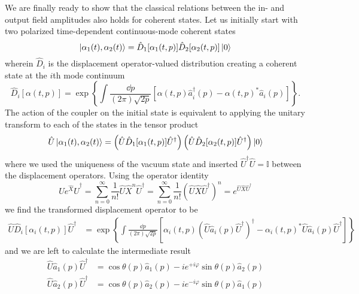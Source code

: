 We are finally ready to show that the classical relations between the in- and output field amplitudes also holds for coherent states.
Let us initially start with two polarized time-dependent continuous-mode coherent states
\begin{equation}
	\ket{\alpha_1(t),\alpha_2(t)}
	=
	\hat{D}_1[\alpha_1(t,p)]
	\hat{D}_2[\alpha_2(t,p)]
	\ket{0}
\end{equation}
wherein $\hat{D}_i$ is the displacement operator-valued distribution creating a coherent state at the $i$th mode continuum
\begin{equation}
	\hat{D}_i[\alpha(t,p)]
	=
	\exp\left\{
		\int\frac{\dd{p}}{(2\pi)\sqrt{2p}}
		\left[
			\alpha(t,p)
			\hat{a}_i^\dagger(p)
			-
			\alpha(t,p)^*
			\hat{a}_i(p)
		\right]
	\right\}
	.
\end{equation}
The action of the coupler on the initial state is equivalent to applying the unitary transform to each of the states in the tensor product
\begin{equation}
	\hat{U}
	\ket{\alpha_1(t),\alpha_2(t)}
	=
	\left(
		\hat{U}
		\hat{D}_1[\alpha_1(t,p)]
		\hat{U}^\dagger
	\right)
	\left(
		\hat{U}
		\hat{D}_2[\alpha_2(t,p)]
		\hat{U}^\dagger
	\right)
	\ket{0}
\end{equation}
where we used the uniqueness of the vacuum state and inserted $\hat{U}^\dagger\hat{U}=\mathbb{I}$ between the displacement operators.
Using the operator identity
\begin{equation}
	\hat{U}
	e^{\hat{X}}
	\hat{U}^\dagger
	=
	\sum_{n=0}^\infty
	\frac{1}{n!}
	\hat{U}
	\hat{X}^n
	\hat{U}^\dagger
	=
	\sum_{n=0}^\infty
	\frac{1}{n!}
	\left(
		\hat{U}
		\hat{X}
		\hat{U}^\dagger
	\right)^n
	=
	e^{\hat{U}\hat{X}\hat{U}^\dagger}
\end{equation}
we find the transformed displacement operator to be
\begin{equation}
	\begin{split}
		\hat{U}
		\hat{D}_i[\alpha_i(t,p)]
		\hat{U}^\dagger
		&=
		\exp\left\{
			\int\frac{\dd{p}}{(2\pi)\sqrt{2p}}
			\left[
				\alpha_i(t,p)
				\left(
					\hat{U}
					\hat{a}_i(p)
					\hat{U}^\dagger
				\right)^\dagger
				-
				\alpha_i(t,p)^*
				\hat{U}
				\hat{a}_i(p)
				\hat{U}^\dagger
			\right]
		\right\}
	\end{split}
\end{equation}
and we are left to calculate the intermediate result
\begin{align}
	\hat{U}
	\hat{a}_1(p)
	\hat{U}^\dagger
	&=
	\cos\theta(p)
	\hat{a}_1(p)
	-
	ie^{+i\varphi}
	\sin\theta(p)
	\hat{a}_2(p)
	\\
	\hat{U}
	\hat{a}_2(p)
	\hat{U}^\dagger
	&=
	\cos\theta(p)
	\hat{a}_2(p)
	-
	ie^{-i\varphi}
	\sin\theta(p)
	\hat{a}_1(p)
\end{align}

